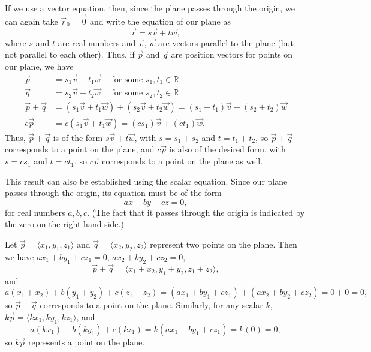 \documentclass[letterpaper,12pt]{article}
\newcommand{\R}{\mathbb{R}}
\begin{document}
\begin{enumerate}
\begin{enumerate}
If we use a vector equation, then, since the plane passes through the origin, we can again take $\vec{r}_0=\vec{0}$ and write the equation of our plane as
\[
 \vec{r} = s\vec{v}+t\vec{w},
\]
where $s$ and $t$ are real numbers and $\vec{v}$, $\vec{w}$ are vectors parallel to the plane (but not parallel to each other). Thus, if $\vec{p}$ and $\vec{q}$ are position vectors for points on our plane, we have
\begin{align*}
 \vec{p} & = s_1\vec{v}+t_1\vec{w} \quad \text{ for some $s_1, t_1\in \R$}\\
 \vec{q} & = s_2\vec{v}+t_2\vec{w} \quad \text{ for some $s_2, t_2\in \R$}\\
 \vec{p}+\vec{q} & = (s_1\vec{v}+t_1\vec{w})+(s_2\vec{v}+t_2\vec{w}) = (s_1+t_1)\vec{v}+(s_2+t_2)\vec{w}\\
 c\vec{p} & = c(s_1\vec{v}+t_1\vec{w}) = (cs_1)\vec{v}+(ct_1)\vec{w}.
\end{align*}
Thus, $\vec{p}+\vec{q}$ is of the form $s\vec{v}+t\vec{w}$, with $s=s_1+s_2$ and $t=t_1+t_2$, so $\vec{p}+\vec{q}$ corresponds to a point on the plane, and $c\vec{p}$ is also of the desired form, with $s=cs_1$ and $t=ct_1$, so $c\vec{p}$ corresponds to a point on the plane as well.

\bigskip

This result can also be established using the scalar equation. Since our plane passes through the origin, its equation must be of the form 
\[
 ax+by+cz=0,
\]
for real numbers $a,b,c$. (The fact that it passes through the origin is indicated by the zero on the right-hand side.)

Let $\vec{p}=\langle x_1,y_1,z_1\rangle$ and $\vec{q}=\langle x_2,y_2,z_2\rangle$ represent two points on the plane. Then we have $ax_1+by_1+cz_1=0$, $ax_2+by_2+cz_2=0$, 
\[
 \vec{p}+\vec{q} = \langle x_1+x_2,y_1+y_2,z_1+z_2\rangle,
\]
and
\[
 a(x_1+x_2)+b(y_1+y_2)+c(z_1+z_2) = (ax_1+by_1+cz_1)+(ax_2+by_2+cz_2) = 0+0 = 0,
\]
so $\vec{p}+\vec{q}$ corresponds to a point on the plane. Similarly, for any scalar $k$, $k\vec{p} = \langle kx_1,ky_1,kz_1\rangle$, and
\[
 a(kx_1)+b(ky_1)+c(kz_1) = k(ax_1+by_1+cz_1) = k(0)=0,
\]
so $k\vec{p}$ represents a point on the plane.
\end{enumerate}
\end{enumerate}
\end{document}
